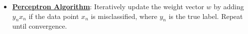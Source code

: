 \documentclass{article}%
\begin{document}
\begin{itemize}[leftmargin=*]%
\item \href{https://purdue.brightspace.com/d2l/common/assets/pdfjs-d2l-dist/1.0.14-legacy/web/viewer.html?file=%2Fcontent%2Fenforced%2F1095467-wl.202510.CS.24300.001%2F05L2-ML Basics.pdf%3Fou%3D1095467&lang=en-us&container=d2l-fileviewer-rendered-pdf&fullscreen=d2l-fileviewer-rendered-pdf-dialog&height=667#page=30}{\textbf{Perceptron Algorithm}}: Iteratively update the weight vector $w$ by adding $y_nx_n$ if the data point $x_n$ is misclassified, where $y_n$ is the true label. Repeat until convergence.%
\end{itemize}

%
\end{document}
